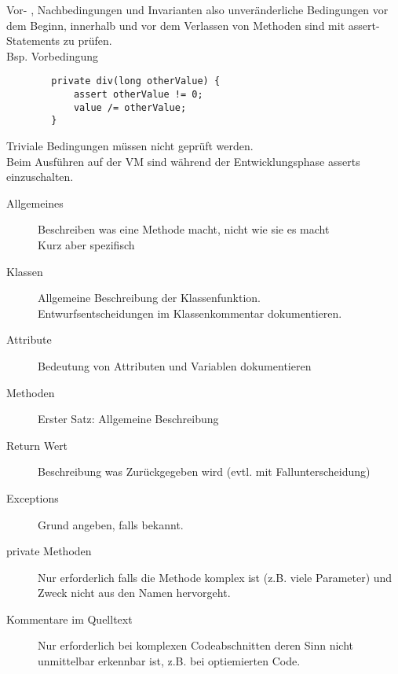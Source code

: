 \item [Vor- , Nachbedingungen und Invarianten]
	Vor- , Nachbedingungen und Invarianten also unveränderliche Bedingungen vor dem Beginn,
	innerhalb und vor dem Verlassen von Methoden sind mit assert-Statements zu prüfen. \\
	Bsp. Vorbedingung
	\begin{lstlisting}
		private div(long otherValue) {
			assert otherValue != 0;
			value /= otherValue;
		}
	\end{lstlisting}
	Triviale Bedingungen müssen nicht geprüft werden. \\
	Beim Ausführen auf der VM sind während der Entwicklungsphase asserts einzuschalten.

\item [Javadoc und Kommentare]

\begin{description}
	\item [Allgemeines]
	    Beschreiben was eine Methode macht, nicht wie sie es macht\\
	    Kurz aber spezifisch
	\item [Klassen]
		Allgemeine Beschreibung der Klassenfunktion.\\
	    Entwurfsentscheidungen im Klassenkommentar dokumentieren.
	\item [Attribute]
    	Bedeutung von Attributen und Variablen dokumentieren 
	\item [Methoden]
		Erster Satz: Allgemeine Beschreibung \\
	\item [Return Wert]
		Beschreibung was Zurückgegeben wird (evtl. mit Fallunterscheidung)
	\item [Exceptions]
		Grund angeben, falls bekannt.
	\item [private Methoden]
		Nur erforderlich falls die Methode komplex ist (z.B. viele Parameter)
		und Zweck nicht aus den Namen hervorgeht.
	\item [Kommentare im Quelltext]
		Nur erforderlich bei komplexen Codeabschnitten deren Sinn nicht
		unmittelbar erkennbar ist, z.B. bei optiemierten Code.
\end{description}
  	  	 


